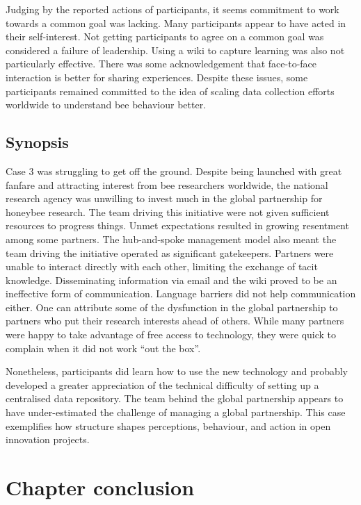 Judging by the reported actions of participants, it seems commitment to work towards a common goal was lacking. Many participants appear to have acted in their self-interest. Not getting participants to agree on a common goal was considered a failure of leadership. Using a wiki to capture learning was also not particularly effective. There was some acknowledgement that face-to-face interaction is better for sharing experiences. Despite these issues, some participants remained committed to the idea of scaling data collection efforts worldwide to understand bee behaviour better.

\subsection{Synopsis}

Case 3 was struggling to get off the ground. Despite being launched with great fanfare and attracting interest from bee researchers worldwide, the national research agency was unwilling to invest much in the global partnership for honeybee research. The team driving this initiative were not given sufficient resources to progress things. Unmet expectations resulted in growing resentment among some partners. The hub-and-spoke management model also meant the team driving the initiative operated as significant gatekeepers. Partners were unable to interact directly with each other, limiting the exchange of tacit knowledge. Disseminating information via email and the wiki proved to be an ineffective form of communication. Language barriers did not help communication either. One can attribute some of the dysfunction in the global partnership to partners who put their research interests ahead of others. While many partners were happy to take advantage of free access to technology, they were quick to complain when it did not work \enquote{out the box}. \medskip

Nonetheless, participants did learn how to use the new technology and probably developed a greater appreciation of the technical difficulty of setting up a centralised data repository. The team behind the global partnership appears to have under-estimated the challenge of managing a global partnership. This case exemplifies how structure shapes perceptions, behaviour, and action in open innovation projects.

\section{Chapter conclusion}


